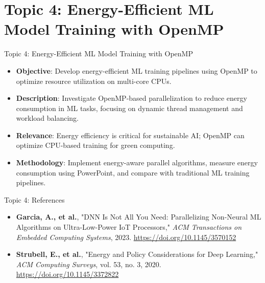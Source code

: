 \documentclass{beamer}
\begin{document}
\section{Topic 4: Energy-Efficient ML Model Training with OpenMP}
\begin{frame}{Topic 4: Energy-Efficient ML Model Training with OpenMP}
\begin{itemize}
    \item \textbf{Objective}: Develop energy-efficient ML training pipelines using OpenMP to optimize resource utilization on multi-core CPUs.
    \item \textbf{Description}: Investigate OpenMP-based parallelization to reduce energy consumption in ML tasks, focusing on dynamic thread management and workload balancing.
    \item \textbf{Relevance}: Energy efficiency is critical for sustainable AI; OpenMP can optimize CPU-based training for green computing.
    \item \textbf{Methodology}: Implement energy-aware parallel algorithms, measure energy consumption using 
PowerPoint, and compare with traditional ML training pipelines.
\end{itemize}
\end{frame}

\begin{frame}{Topic 4: References}
\begin{itemize}
    \item \textbf{Garcia, A., et al.}, "DNN Is Not All You Need: Parallelizing Non-Neural ML Algorithms on Ultra-Low-Power IoT Processors," \textit{ACM Transactions on Embedded Computing Systems}, 2023. \url{https://doi.org/10.1145/3570152}
    \item \textbf{Strubell, E., et al.}, "Energy and Policy Considerations for Deep Learning," \textit{ACM Computing Surveys}, vol. 53, no. 3, 2020. \url{https://doi.org/10.1145/3372822}

\end{itemize}
\end{frame}
\end{document}
